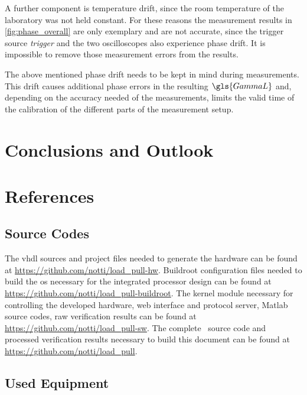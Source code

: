 \documentclass[12pt,a4paper,parskip=full,abstract=true,BCOR=12mm,twoside,open=right]{scrreprt}
\def\device#1{\textit{#1}}
\begin{document}
A further component is temperature drift, since the room temperature
of the laboratory was not held constant. For these reasons the measurement results in
\cref{fig:phase_overall} are only exemplary and are not accurate, since the trigger
source \device{trigger} and the two oscilloscopes also experience phase drift. It is
impossible to remove those measurement errors from the results.

The above mentioned phase drift needs to be kept in mind during measurements. This
drift causes additional phase errors in the resulting $\gls{GammaL}$ and, depending on
the accuracy needed of the measurements, limits the valid time of the calibration of
the different parts of the measurement setup.


\chapter{Conclusions and Outlook}

\appendix
\chapter{References}
\section{Source Codes}
\label{sec:sources}

The \gls{vhdl} sources and project files needed to generate the hardware can be found at
\url{https://github.com/notti/load_pull-hw}. Buildroot configuration files needed to build
the \gls{os} necessary for the integrated processor design can be found at
\url{https://github.com/notti/load_pull-buildroot}. The kernel module necessary for controlling
the developed hardware, web interface and protocol server, Matlab source codes, raw verification results
can be found at \url{https://github.com/notti/load_pull-sw}. The complete \LuaLaTeX~source code
and processed verification results necessary to build this document can be found at
\url{https://github.com/notti/load_pull}.

\section{Used Equipment}
\label{sec:instruments}
\end{document}
